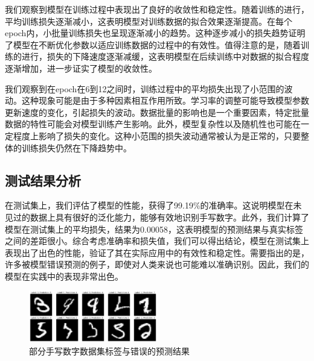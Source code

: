 我们观察到模型在训练过程中表现出了良好的收敛性和稳定性。随着训练的进行，平均训练损失逐渐减小，这表明模型对训练数据的拟合效果逐渐提高。在每个epoch内，小批量训练损失也呈现逐渐减小的趋势。这种逐步减小的损失趋势证明了模型在不断优化参数以适应训练数据的过程中的有效性。值得注意的是，随着训练的进行，损失的下降速度逐渐减缓，这表明模型在后续训练中对数据的拟合程度逐渐增加，进一步证实了模型的收敛性。

我们观察到在epoch在6到12之间时，训练过程中的平均损失出现了小范围的波动。这种现象可能是由于多种因素相互作用所致。学习率的调整可能导致模型参数更新速度的变化，引起损失的波动。数据批量的影响也是一个重要因素，特定批量数据的特性可能会对模型训练产生影响。此外，模型复杂性以及随机性也可能在一定程度上影响了损失的变化。这种小范围的损失波动通常被认为是正常的，只要整体的训练损失仍然在下降趋势中。

\subsection{测试结果分析}

在测试集上，我们评估了模型的性能，获得了99.19\%的准确率。这说明模型在未见过的数据上具有很好的泛化能力，能够有效地识别手写数字。此外，我们计算了模型在测试集上的平均损失，结果为0.00058，这表明模型的预测结果与真实标签之间的差距很小。综合考虑准确率和损失值，我们可以得出结论，模型在测试集上表现出了出色的性能，验证了其在实际应用中的有效性和稳定性。需要指出的是，许多被模型错误预测的例子，即使对人类来说也可能难以准确识别。因此，我们的模型在实践中的表现非常出色。

\begin{figure}[htbp]
  \centering
  \includegraphics[width=0.5\textwidth]{figures/dataset_mispredictions}
  \caption{部分手写数字数据集标签与错误的预测结果}
\end{figure}